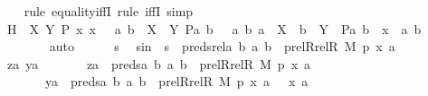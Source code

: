 \begin{isabellebody}
\ \ \isamarkupfalse%
\ {\isacharparenleft}{\kern0pt}rule\ equality{\isacharunderscore}{\kern0pt}iffI{\isacharcomma}{\kern0pt}\ rule\ iffI{\isacharcomma}{\kern0pt}\ simp{\isacharparenright}{\kern0pt}\isanewline
\ \ \ \ \isamarkupfalse%
\ H\ {\isacharcolon}{\kern0pt}\ {\isachardoublequoteopen}{\isasymAnd}X\ Y\ P\ x{\isachardot}{\kern0pt}\ x\ {\isasymin}\ {\isacharbraceleft}{\kern0pt}\ {\isacharless}{\kern0pt}a{\isacharcomma}{\kern0pt}\ b{\isachargreater}{\kern0pt}\ {\isasymin}\ X\ {\isasymtimes}\ Y{\isachardot}{\kern0pt}\ P{\isacharparenleft}{\kern0pt}a{\isacharcomma}{\kern0pt}\ b{\isacharparenright}{\kern0pt}\ {\isacharbraceright}{\kern0pt}\ {\isasymLongrightarrow}\ {\isasymexists}a\ b{\isachardot}{\kern0pt}\ a\ {\isasymin}\ X\ {\isasymand}\ b\ {\isasymin}\ Y\ {\isasymand}\ P{\isacharparenleft}{\kern0pt}a{\isacharcomma}{\kern0pt}\ b{\isacharparenright}{\kern0pt}\ {\isasymand}\ x\ {\isacharequal}{\kern0pt}\ {\isacharless}{\kern0pt}a{\isacharcomma}{\kern0pt}\ b{\isachargreater}{\kern0pt}{\isachardoublequoteclose}\ \isanewline
\ \ \ \ \ \ \isamarkupfalse%
\ auto\isanewline
\isanewline
\ \ \ \ \isamarkupfalse%
\ s\ \isamarkupfalse%
\ sin\ {\isacharcolon}{\kern0pt}\ {\isachardoublequoteopen}s\ {\isasymin}\ preds{\isacharunderscore}{\kern0pt}rel{\isacharparenleft}{\kern0pt}{\isasymlambda}a\ b{\isachardot}{\kern0pt}\ {\isasymlangle}a{\isacharcomma}{\kern0pt}\ b{\isasymrangle}\ {\isasymin}\ prel{\isacharparenleft}{\kern0pt}Rrel{\isacharparenleft}{\kern0pt}R{\isacharcomma}{\kern0pt}\ M{\isacharparenright}{\kern0pt}{\isacharcomma}{\kern0pt}\ p{\isacharparenright}{\kern0pt}{\isacharcomma}{\kern0pt}\ {\isasymlangle}x{\isacharcomma}{\kern0pt}\ a{\isasymrangle}{\isacharparenright}{\kern0pt}{\isachardoublequoteclose}\isanewline
\ \ \ \ \isamarkupfalse%
\ \isamarkupfalse%
\ {\isachardoublequoteopen}{\isasymexists}za\ ya{\isachardot}{\kern0pt}\ \isanewline
\ \ \ \ \ \ za\ {\isasymin}\ preds{\isacharparenleft}{\kern0pt}{\isasymlambda}a\ b{\isachardot}{\kern0pt}\ {\isasymlangle}a{\isacharcomma}{\kern0pt}\ b{\isasymrangle}\ {\isasymin}\ prel{\isacharparenleft}{\kern0pt}Rrel{\isacharparenleft}{\kern0pt}R{\isacharcomma}{\kern0pt}\ M{\isacharparenright}{\kern0pt}{\isacharcomma}{\kern0pt}\ p{\isacharparenright}{\kern0pt}{\isacharcomma}{\kern0pt}\ {\isasymlangle}x{\isacharcomma}{\kern0pt}\ a{\isasymrangle}{\isacharparenright}{\kern0pt}\isanewline
\ \ \ \ \ \ {\isasymand}\ ya\ {\isasymin}\ preds{\isacharparenleft}{\kern0pt}{\isasymlambda}a\ b{\isachardot}{\kern0pt}\ {\isasymlangle}a{\isacharcomma}{\kern0pt}\ b{\isasymrangle}\ {\isasymin}\ prel{\isacharparenleft}{\kern0pt}Rrel{\isacharparenleft}{\kern0pt}R{\isacharcomma}{\kern0pt}\ M{\isacharparenright}{\kern0pt}{\isacharcomma}{\kern0pt}\ p{\isacharparenright}{\kern0pt}{\isacharcomma}{\kern0pt}\ {\isasymlangle}x{\isacharcomma}{\kern0pt}\ a{\isasymrangle}{\isacharparenright}{\kern0pt}\ {\isasymunion}\ {\isacharbraceleft}{\kern0pt}\ {\isacharless}{\kern0pt}x{\isacharcomma}{\kern0pt}\ a{\isachargreater}{\kern0pt}\ {\isacharbraceright}{\kern0pt}\isanewline

\end{isabellebody}
